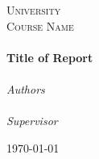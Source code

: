\begin{titlepage}
  \begin{center}

    \textsc{\LARGE University}\\[1.5cm]
    \textsc{\Large Course Name}\\[0.5cm]

    \HRule\\[0.4cm]
    {\huge \bfseries Title of Report\\[0.4cm]}
    \HRule\\[1.5cm]

    \emph{Authors}\\[0.1cm]
    \noindent{}\\[1cm]

    \emph{Supervisor}
    \noindent{}

    \vfill

    {\large \today}

  \end{center}
\end{titlepage}
